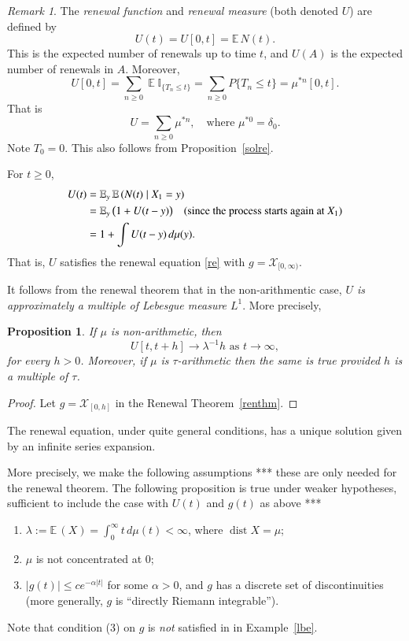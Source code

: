 \documentclass[a4paper]{amsart}
\theoremstyle{plain}
\newtheorem{proposition}[theorem]{Proposition}
\theoremstyle{definition}
\theoremstyle{remark}
\newtheorem{remark}[theorem]{Remark}
\DeclareMathOperator{\dist}{dist}
\DeclareMathOperator{\expected}{\mathbb{E}}
\begin{document}
\begin{remark} 
The \emph{renewal function} and \emph{renewal measure} (both denoted $ U $) are  defined by 
\[
U(t) =  U[0,t] =\mathbb{E}\, N(t).
\]
This is the expected number of renewals up to time $ t $, and $ U(A) $ is the expected number of renewals in $ A $. Moreover,
\[
U[0,t] = \sum_{n\geq 0} \expected \mathbb{I}_{\{T_n \leq t \}} = \sum_{n\geq 0} P\{ T_n \leq t\} = \mu^{*n}[0,t] .
\] 
That is 
\begin{equation} \label{} 
U = \sum_{n\geq 0}  \mu^{*n}, \quad \text{where } \mu^{*0} = \delta _ 0 .
\end{equation} 
 Note $ T_0 = 0 $.   This also follows from Proposition~\ref{solre}. 

For $ t\geq 0 $,
\begin{align*}
U(t) &= \mathbb{E}_y\, \mathbb{E} \, (N(t) \mid X_1 = y ) \\
&= \mathbb{E} _y\, \big( 1 + U(t-y)\big) \quad \text{(since the process starts again at $ X_1 $)}\\
&= 1 + \int U(t-y)\, d\mu(y).
\end{align*}  
That is,  $ U $ satisfies the renewal equation \eqref{re} with $ g = \mathcal{X} _{[0,\infty)} $.

It follows from the renewal theorem   that in the non-arithmentic case, \emph{$ U $ is approximately a multiple of Lebesgue measure $ L^1 $}.  
More precisely,
 \begin{proposition}
 If $ \mu $ is non-arithmetic, then
 \[
 U[t,t+h] \to \lambda ^{-1} h \text{ as } t \to \infty ,
 \] 
 for every $ h > 0 $.  Moreover, if $ \mu $ is $ \tau $-arithmetic then the same is true provided $ h $ is a multiple of $ \tau $.
\end{proposition} 

\begin{proof} Let  $ g = \mathcal{X}_[0,h] $ in the Renewal Theorem~\ref{renthm}.
\end{proof} 
\end{remark} 

The renewal equation, under quite general conditions, has a unique solution given by an infinite series expansion.

More precisely, we make the following assumptions
*** these are only needed for the renewal theorem.  The following proposition is true under weaker hypotheses, sufficient to include 
the case with $ U(t) $ and $ g(t) $ as above ***
\begin{enumerate}
\item $ \lambda := \mathbb{E} \, (X) = \int _0^\infty  t \, d\mu(t) < \infty $, where $ \dist X = \mu $;


\item  $ \mu $ is not concentrated at $ 0 $;
\item $ |g(t) | \leq c e^{- \alpha |t| } $ for some $ \alpha > 0 $, and $ g $ has a discrete set of discontinuities (more generally, $ g $ is ``directly Riemann integrable'').
\end{enumerate}
Note that   condition (3) on $ g $ is \emph{not} satisfied in  in Example~\ref{lbe}.
\end{document}

